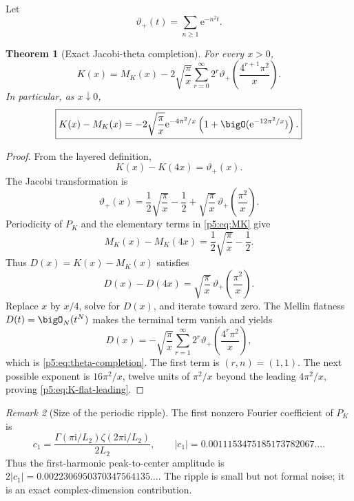 \documentclass[11pt]{article}
\numberwithin{equation}{section}
\newtheorem{theorem}{Theorem}[section]
\theoremstyle{definition}
\theoremstyle{remark}
\newtheorem{remark}[theorem]{Remark}
\newcommand{\e}{\mathrm e}
\newcommand{\ii}{\mathrm i}
\begin{document}
Let
\begin{equation}\label{p5:eq:theta-plus}
 \vartheta_+(t)=\sum_{n\ge1}\e^{-n^2t}.
\end{equation}

\begin{theorem}[Exact Jacobi-theta completion]\label{p5:thm:theta-completion}
For every $x>0$,
\begin{equation}\label{p5:eq:theta-completion}
 \boxed{
 K(x)=M_K(x)-2\sqrt{\frac\pi x}
 \sum_{r=0}^{\infty}2^r
 \vartheta_+\!\left(\frac{4^{r+1}\pi^2}{x}\right).}
\end{equation}
In particular, as $x\downarrow0$,
\begin{equation}\label{p5:eq:K-flat-leading}
 \boxed{
 K(x)-M_K(x)=
 -2\sqrt{\frac\pi x}\e^{-4\pi^2/x}
 \left(1+\bigO(\e^{-12\pi^2/x})\right).}
\end{equation}
\end{theorem}

\begin{proof}
From the layered definition,
\begin{equation}\label{p5:eq:K-difference}
 K(x)-K(4x)=\vartheta_+(x).
\end{equation}
The Jacobi transformation is
\begin{equation}\label{p5:eq:Jacobi-plus}
 \vartheta_+(x)=\frac12\sqrt{\frac\pi x}-\frac12
 +\sqrt{\frac\pi x}\,\vartheta_+\!\left(\frac{\pi^2}{x}\right).
\end{equation}
Periodicity of $P_K$ and the elementary terms in \cref{p5:eq:MK} give
\begin{equation}\label{p5:eq:MK-difference}
 M_K(x)-M_K(4x)=\frac12\sqrt{\frac\pi x}-\frac12.
\end{equation}
Thus $D(x)=K(x)-M_K(x)$ satisfies
\begin{equation}\label{p5:eq:D-difference}
 D(x)-D(4x)=\sqrt{\frac\pi x}\,
 \vartheta_+\!\left(\frac{\pi^2}{x}\right).
\end{equation}
Replace $x$ by $x/4$, solve for $D(x)$, and iterate toward zero.  The Mellin
flatness $D(t)=\bigO_N(t^N)$ makes the terminal term vanish and yields
\[
 D(x)=-\sqrt{\frac\pi x}
 \sum_{r=1}^{\infty}2^r
 \vartheta_+\!\left(\frac{4^r\pi^2}{x}\right),
\]
which is \cref{p5:eq:theta-completion}.  The first term is $(r,n)=(1,1)$.
The next possible exponent is $16\pi^2/x$, twelve units of $\pi^2/x$ beyond
the leading $4\pi^2/x$, proving \cref{p5:eq:K-flat-leading}.
\end{proof}

\begin{remark}[Size of the periodic ripple]
The first nonzero Fourier coefficient of $P_K$ is
\[
 c_1=\frac{\Gamma(\pi\ii/L_2)\zeta(2\pi\ii/L_2)}{2L_2},
 \qquad |c_1|=0.0011153475185173782067\ldots.
\]
Thus the first-harmonic peak-to-center amplitude is
$2|c_1|=0.0022306950370347564135\ldots$.  The ripple is small but not
formal noise; it is an exact complex-dimension contribution.
\end{remark}
\end{document}

